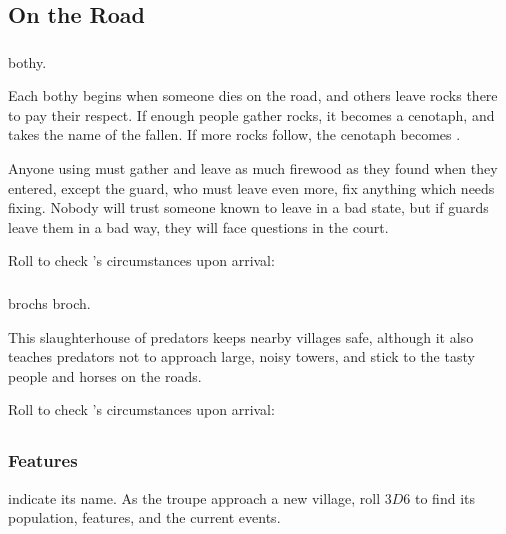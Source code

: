 \begin{multicols}{2}

\subsection{On the Road}

\subsubsection{}
\glsdesc{bothy}.

Each \gls{bothy} begins when someone dies on the road, and others leave rocks there to pay their respect.
If enough people gather rocks, it becomes a cenotaph, and takes the name of the fallen.
If more rocks follow, the cenotaph becomes .

Anyone using  must gather and leave as much firewood as they found when they entered, except the \gls{guard}, who must leave even more, fix anything which needs fixing.
Nobody will trust someone known to leave  in a bad state, but if \glspl{guard} leave them in a bad way, they will face questions in the \gls{court}.

Roll to check 's circumstances upon arrival:

\bothyEvents

\subsubsection{}

\Glspl{broch} \glsdesc{broch}.

This slaughterhouse of predators keeps nearby \glspl{village} safe, although it also teaches predators not to approach large, noisy towers, and stick to the tasty people and horses on the roads.

Roll to check 's circumstances upon arrival:

\brochEvents

\subsection{}

\subsubsection{ Features}
\label{villageFeatures}
indicate its name.
As the troupe approach a new \gls{village}, roll $3D6$ to find its population, features, and the current events.


\end{multicols}
